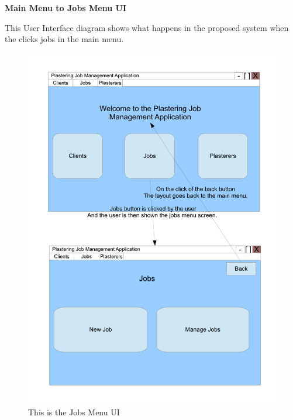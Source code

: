 \pagebreak
\textbf{Main Menu to Jobs Menu UI}
\begin{flushleft}
This User Interface diagram shows what happens in the proposed system when the clicks jobs in the main menu.
\end{flushleft}
\begin{figure}[H]
\includegraphics[scale=0.5]{./Design/images/JobsMenu.pdf}
    \caption{This is the Jobs Menu UI} 
\label{fig:FlowChartJobsMenu}
\end{figure}


